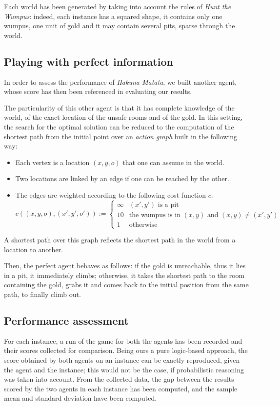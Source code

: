 \documentclass{llncs}
\newcommand{\htw}{\emph{Hunt the Wumpus}\xspace}
\newcommand{\hm}{\emph{Hakuna Matata}\xspace}
\begin{document}
Each world has been generated by taking into account the rules of \htw: indeed, each instance has a squared shape, it contains only one wumpus, one unit of gold and it may contain several pits, sparse through the world.

\subsection{Playing with perfect information}

In order to assess the performance of \hm, we built another agent, whose score has then been referenced in evaluating our results.

The particularity of this other agent is that it has complete knowledge of the world, of the exact location of the unsafe rooms and of the gold.
In this setting, the search for the optimal solution can be reduced to the computation of the shortest path from the initial point over an \emph{action graph} built in the following way:
\begin{itemize}
	\item Each vertex is a location $(x,y,o)$ that one can assume in the world.
	\item Two locations are linked by an edge if one can be reached by the other.
	\item The edges are weighted according to the following cost function $c$:
	$$
	c((x, y, o), (x', y', o')) :=
	\begin{cases}
		\infty & (x', y') \text{ is a pit} \\
		10 & \text{the wumpus is in } (x,y) \text{ and } (x,y) \neq (x',y') \\
		1 & \text{otherwise}
	\end{cases}
	$$

\end{itemize}
A shortest path over this graph reflects the shortest path in the world from a location to another.

Then, the perfect agent behaves as follows: if the gold is unreachable, thus it lies in a pit, it immediately climbs; otherwise, it takes the shortest path to the room containing the gold, grabs it and comes back to the initial position from the same path, to finally climb out.

\subsection{Performance assessment}

For each instance, a run of the game for both the agents has been recorded and their scores collected for comparison.
Being ours a pure logic-based approach, the score obtained by both agents on an instance can be exactly reproduced, given the agent and the instance; this would not be the case, if probabilistic reasoning was taken into account.
From the collected data, the gap between the results scored by the two agents in each instance has been computed, and the sample mean and standard deviation have been computed.
\end{document}
